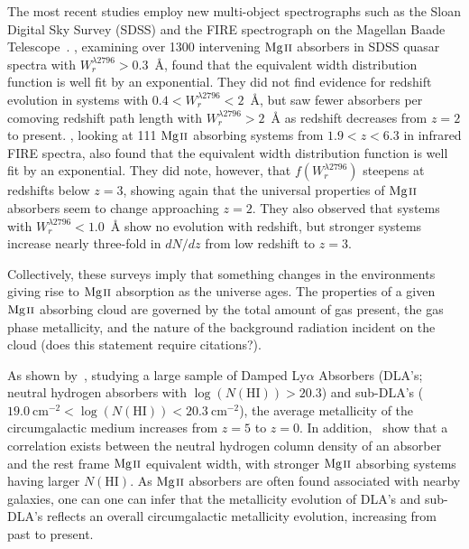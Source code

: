 \documentclass[iop,apj,numberedappendix,appendixfloats,twocolappendix]{emulateapj}
\begin{document}
The most recent studies employ new multi-object spectrographs such as the Sloan Digital Sky Survey (SDSS) and the FIRE spectrograph on the Magellan Baade Telescope~\citep{Nestor2005,Matejek2012}. \cite{Nestor2005}, examining over 1300 intervening ${\hbox{{\rm Mg}\kern 0.1em{\sc ii}}}$ absorbers in SDSS quasar spectra with $W_r^{\lambda2796} > 0.3$~{\AA}, found that the equivalent width distribution function is well fit by an exponential. They did not find evidence for redshift evolution in systems with $0.4 < W_r^{\lambda2796} < 2$~{\AA}, but saw fewer absorbers per comoving redshift path length with $W_r^{\lambda2796} > 2$~{\AA} as redshift decreases from $z = 2$ to present. \cite{Matejek2012}, looking at 111 ${\hbox{{\rm Mg}\kern 0.1em{\sc ii}}}$ absorbing systems from $1.9 < z < 6.3$ in infrared FIRE spectra, also found that the equivalent width distribution function is well fit by an exponential. They did note, however, that $f(W_r^{\lambda2796})$ steepens at redshifts below $z = 3$, showing again that the universal properties of ${\hbox{{\rm Mg}\kern 0.1em{\sc ii}}}$ absorbers seem to change approaching $z = 2$. They also observed that systems with $W_r^{\lambda2796} < 1.0$~{\AA} show no evolution with redshift, but stronger systems increase nearly three-fold in $dN\!/dz$ from low redshift to $z = 3$. 

Collectively, these surveys imply that something changes in the environments giving rise to ${\hbox{{\rm Mg}\kern 0.1em{\sc ii}}}$ absorption as the universe ages. The properties of a given ${\hbox{{\rm Mg}\kern 0.1em{\sc ii}}}$ absorbing cloud are governed by the total amount of gas present, the gas phase metallicity, and the nature of the background radiation incident on the cloud (does this statement require citations?). 

As shown by~\cite{Quiret2016}, studying a large sample of Damped Ly$\alpha$ Absorbers (DLA's; neutral hydrogen absorbers with $\log(N(\mathrm{HI})) > 20.3$) and sub-DLA's ($19.0~\mathrm{cm^{-2}} < \log(N(\mathrm{HI})) < 20.3~\mathrm{cm^{-2}}$), the average metallicity of the circumgalactic medium increases from $z = 5$ to $z = 0$. In addition,~\cite{Menard2009} show that a correlation exists between the neutral hydrogen column density of an absorber and the rest frame ${\hbox{{\rm Mg}\kern 0.1em{\sc ii}}}$ equivalent width, with stronger ${\hbox{{\rm Mg}\kern 0.1em{\sc ii}}}$ absorbing systems having larger $N(\mathrm{HI})$. As ${\hbox{{\rm Mg}\kern 0.1em{\sc ii}}}$ absorbers are often found associated with nearby galaxies, one can one can infer that the metallicity evolution of DLA's and sub-DLA's reflects an overall circumgalactic metallicity evolution, increasing from past to present.

\end{document}
